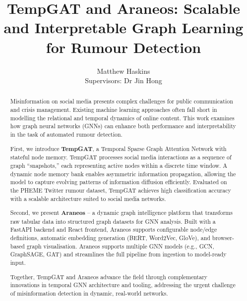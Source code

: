 \documentclass[12pt]{article}
\begin{document}
\title{TempGAT and Araneos: Scalable and Interpretable Graph Learning for Rumour Detection}
\author{Matthew Haskins\\Supervisors: Dr Jin Hong}
\date{}
\maketitle

\begin{abstract}
    Misinformation on social media presents complex challenges for public communication and crisis management. Existing machine learning approaches often fall short in modelling the relational and temporal dynamics of online content. This work examines how graph neural networks (GNNs) can enhance both performance and interpretability in the task of automated rumour detection.\newline

First, we introduce \textbf{TempGAT}, a Temporal Sparse Graph Attention Network with stateful node memory. TempGAT processes social media interactions as a sequence of graph “snapshots,” each representing active nodes within a discrete time window. A dynamic node memory bank enables asymmetric information propagation, allowing the model to capture evolving patterns of information diffusion efficiently. Evaluated on the PHEME Twitter rumour dataset, TempGAT achieves high classification accuracy with a scalable architecture suited to social media networks.
\newline

Second, we present \textbf{Araneos} – a dynamic graph intelligence platform that transforms raw tabular data into structured graph datasets for GNN analysis. Built with a FastAPI backend and React frontend, Araneos supports configurable node/edge definitions, automatic embedding generation (BERT, Word2Vec, GloVe), and browser-based graph visualisation. Araneos supports multiple GNN models (e.g., GCN, GraphSAGE, GAT) and streamlines the full pipeline from ingestion to model-ready input. \newline

Together, TempGAT and Araneos advance the field through complementary innovations in temporal GNN architecture and tooling, addressing the urgent challenge of misinformation detection in dynamic, real-world networks.

\end{abstract}
\end{document}
